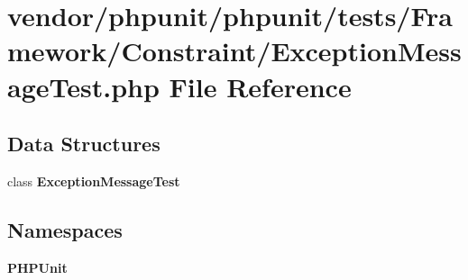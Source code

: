 \section{vendor/phpunit/phpunit/tests/\+Framework/\+Constraint/\+Exception\+Message\+Test.php File Reference}
\label{_exception_message_test_8php}
\subsection*{Data Structures}
\begin{DoxyCompactItemize}
\item 
class {\bf Exception\+Message\+Test}
\end{DoxyCompactItemize}
\subsection*{Namespaces}
\begin{DoxyCompactItemize}
\item 
 {\bf P\+H\+P\+Unit}
\end{DoxyCompactItemize}
